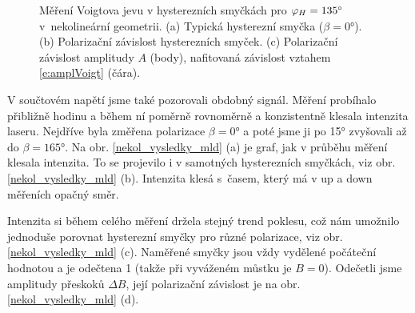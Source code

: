 \begin{figure}[htbp]\centering
{}
	\caption{Měření Voigtova jevu v hysterezních smyčkách pro $\varphi_H=\ang{135}$ v~nekolineární geometrii. (a) Typická hysterezní smyčka ($\beta=\ang{0}$). (b) Polarizační závislost hysterezních smyček. (c) Polarizační závislost amplitudy $A$ (body), nafitovaná závislost vztahem \eqref{e:amplVoigt} (čára).}\label{nekol_vysledky_voigt}
\end{figure}

V součtovém napětí jsme také pozorovali obdobný signál. Měření probíhalo přibližně hodinu a během ní poměrně rovnoměrně a konzistentně klesala intenzita laseru. Nejdříve byla změřena polarizace $\beta=\ang{0}$ a poté jsme ji po \ang{15} zvyšovali až do $\beta=\ang{165}$. Na obr. \ref{nekol_vysledky_mld} (a) je graf, jak v průběhu měření klesala intenzita. To se projevilo i v samotných hysterezních smyčkách, viz obr. \ref{nekol_vysledky_mld} (b). Intenzita klesá s~časem, který má v up a down měřeních opačný směr.

Intenzita si během celého měření držela stejný trend poklesu, což nám umožnilo jednoduše porovnat hysterezní smyčky pro různé polarizace, viz obr. \ref{nekol_vysledky_mld} (c). Naměřené smyčky jsou vždy vydělené počáteční hodnotou a je odečtena 1 (takže při vyváženém můstku je $B=0$). Odečetli jsme amplitudy přeskoků $\Delta B$, její polarizační závislost je na obr. \ref{nekol_vysledky_mld} (d).

